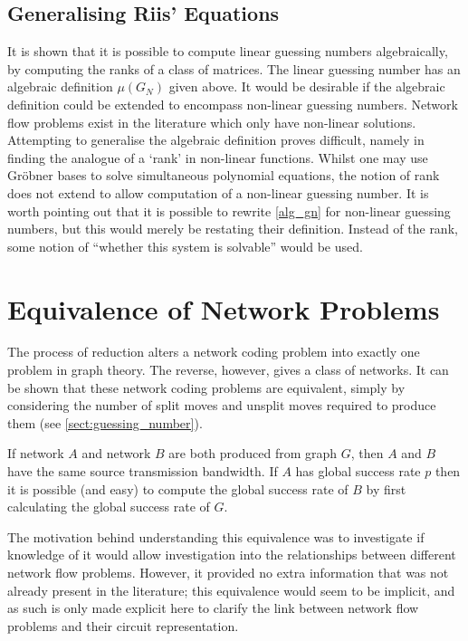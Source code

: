 \subsection{Generalising Riis' Equations}

It is shown that it is possible to compute linear guessing numbers algebraically, by computing the ranks of a class of matrices. The linear guessing number has an algebraic definition $\mu(G_N)$ given above. It would be desirable if the algebraic definition could be extended to encompass non-linear guessing numbers. Network flow problems exist in the literature \cite{doug2005, riis2004} which only have non-linear solutions. Attempting to generalise the algebraic definition proves difficult, namely in finding the analogue of a `rank' in non-linear functions. Whilst one may use Gr\"obner bases to solve simultaneous polynomial equations, the notion of rank does not extend to allow computation of a non-linear guessing number. It is worth pointing out that it is possible to rewrite \autoref{alg_gn} for non-linear guessing numbers, but this would merely be restating their definition. Instead of the rank, some notion of ``whether this system is solvable'' would be used.

\section{Equivalence of Network Problems}

The process of reduction alters a network coding problem into exactly one problem in graph theory. The reverse, however, gives a class of networks. It can be shown that these network coding problems are equivalent, simply by considering the number of split moves and unsplit moves required to produce them (see \autoref{sect:guessing_number}).

If network $A$ and network $B$ are both produced from graph $G$, then $A$ and $B$ have the same source transmission bandwidth. If $A$ has global success rate $p$ then it is possible (and easy) to compute the global success rate of $B$ by first calculating the global success rate of $G$.

The motivation behind understanding this equivalence was to investigate if knowledge of it would allow investigation into the relationships between different network flow problems. However, it provided no extra information that was not already present in the literature; this equivalence would seem to be implicit, and as such is only made explicit here to clarify the link between network flow problems and their circuit representation.


